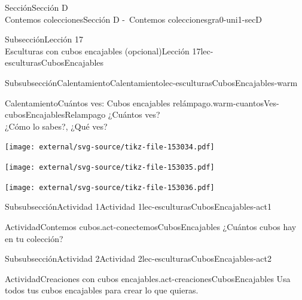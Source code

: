 \begin{sectionptx}{Sección}{{\Large Sección D\\}Contemos colecciones}{}{Sección D -~Contemos colecciones}{}{}{gra0-uni1-secD}
\begin{subsectionptx}{Subsección}{{\normalsize Lección 17\\[-0.05cm]}Esculturas con cubos encajables (opcional)}{}{Lección 17}{}{}{lec-esculturasCubosEncajables}
%
%
\typeout{************************************************}
\typeout{************************************************}
%
\begin{subsubsectionptx}{Subsubsección}{Calentamiento}{}{Calentamiento}{}{}{lec-esculturasCubosEncajables-warm}
\begin{exploration}{Calentamiento}{Cuántos ves: Cubos encajables relámpago.}{warm-cuantosVes-cubosEncajablesRelampago}%
¿Cuántos ves?\\
 ¿Cómo lo sabes?, ¿Qué ves?%
\begin{sidebyside}{3}{0.0166666666666667}{0.0166666666666667}{0.0333333333333333}%
\begin{sbspanel}{0.3}%
\texttt{[image: external/svg-source/tikz-file-153034.pdf]}
\end{sbspanel}%
\begin{sbspanel}{0.3}%
\texttt{[image: external/svg-source/tikz-file-153035.pdf]}
\end{sbspanel}%
\begin{sbspanel}{0.3}%
\texttt{[image: external/svg-source/tikz-file-153036.pdf]}
\end{sbspanel}%
\end{sidebyside}%
\end{exploration}%
\end{subsubsectionptx}
%
%
\typeout{************************************************}
\typeout{************************************************}
%
\begin{subsubsectionptx}{Subsubsección}{Actividad 1}{}{Actividad 1}{}{}{lec-esculturasCubosEncajables-act1}
\begin{activity}{Actividad}{Contemos cubos.}{act-conectemosCubosEncajables}%
¿Cuántos cubos hay en tu colección?%
\end{activity}%
\end{subsubsectionptx}
%
%
\typeout{************************************************}
\typeout{************************************************}
%
\begin{subsubsectionptx}{Subsubsección}{Actividad 2}{}{Actividad 2}{}{}{lec-esculturasCubosEncajables-act2}
\begin{activity}{Actividad}{Creaciones con cubos encajables.}{act-creacionesCubosEncajables}%
Usa todos tus cubos encajables para crear lo que quieras.%
\end{activity}%
\end{subsubsectionptx}

\end{subsectionptx}
\end{sectionptx}

